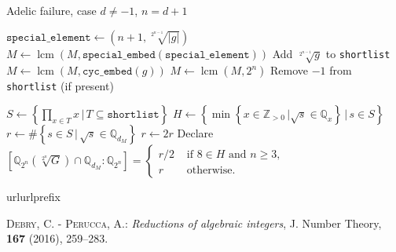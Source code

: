 \documentclass[10pt,a4paper]{article}
\DeclareMathOperator{\lcm}{lcm}
\theoremstyle{definition}
\begin{document}
\begin{algorithm}
\caption{Adelic failure, case $d\neq -1$, $n= d+1$}
\begin{algorithmic}
\State $\texttt{special\_element}\leftarrow(n+1,\sqrt[2^{n-1}]{|g|})$
\State $M\leftarrow\lcm(M,\texttt{special\_embed}(\texttt{special\_element}))$
\Else 
\State Add $\sqrt[2^{n-1}]{g}$ to \texttt{shortlist}
\State $M\leftarrow\lcm(M,\texttt{cyc\_embed}(g))$
\EndIf
\EndFor
\State
\State $M\leftarrow\lcm(M,2^{n})$
\State
\State Remove $-1$ from \texttt{shortlist} (if present)


\State
{}
\State $S\leftarrow\left\{\prod_{x\in T}x\,|\,T\subseteq\texttt{shortlist}\right\}$
\State $H\leftarrow\left\{\min\left\{x\in\mathbb{Z}_{>0}\,|\sqrt{s}\in \mathbb{Q}_x\right\}\,|\,s\in S\right\}$
\State $r\leftarrow\# \left\{s\in S\,|\, \sqrt{s}\in\mathbb{Q}_{d_M}\right\}$
\State
\State $r\leftarrow 2r$
\EndIf
\State Declare $\left[\mathbb{Q}_{2^n}\left(\sqrt[2^n]{G}\right)\cap \mathbb{Q}_{d_M}:\mathbb{Q}_{2^n}\right]=\begin{cases}
r/2&\text{ if }8\in H\text{ and }n\geq 3,\\
r&\text{ otherwise}.
\end{cases}$
\EndFor
\end{algorithmic}

\end{algorithm}

\begin{thebibliography}{10} \expandafter\ifx\csname url\endcsname\relax   \def\url#1{\texttt{#1}}\fi \expandafter\ifx\csname urlprefix\endcsname\relax\def\urlprefix{URL }\fi

\textsc{Debry, C. - Perucca, A.}: \emph{Reductions of algebraic integers}, J. Number Theory, {\bf 167} (2016), 259--283.


\end{thebibliography}
\end{document}

